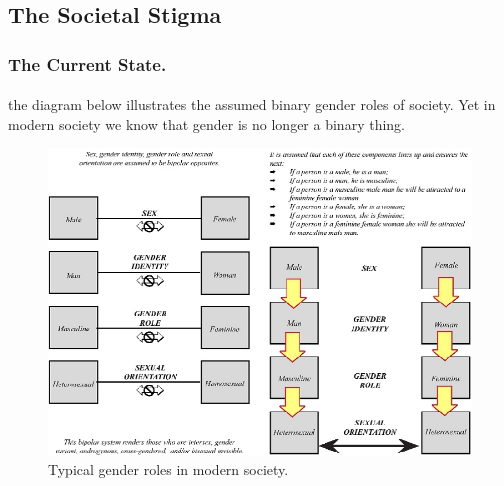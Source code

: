 \subsection{The Societal Stigma}
\subsubsection{The Current State.}
\paragraph{}
the diagram below illustrates the assumed binary gender roles of society. Yet in
modern society we know that gender is no longer a binary thing.

\begin{figure}[h!]
	\centering{}
		\includegraphics[scale=0.6]{figures/gender-roles}
	\caption{Typical gender roles in modern society.\cite[figure 3.3-3.4]{UDGIE}}
\end{figure}


\newpage
\printbibliography
